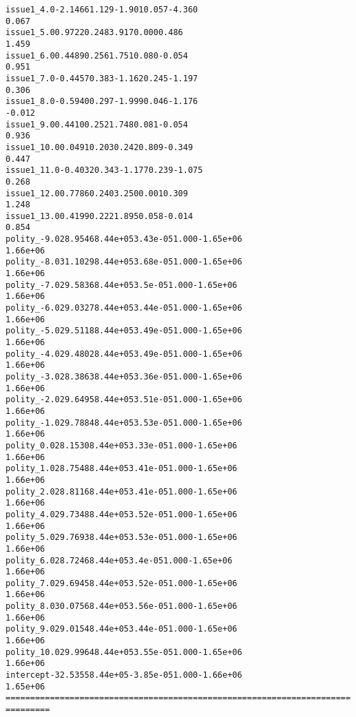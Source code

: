 \documentclass[letterpaper,10pt,english]{/usr/share/sphinx/texinputs/sphinxhowto}
\newenvironment{InvisibleVerbatim}
        {\begin{mdframed}[leftmargin=0.1\linewidth,innerleftmargin=3pt,innerrightmargin=3pt, userdefinedwidth=1\linewidth, linewidth=0pt, linecolor=white, usetwoside=false]}
        {\end{mdframed}}
\begin{document}
\begin{InvisibleVerbatim}
\begin{alltt}
issue1\_4.0     -2.1466      1.129     -1.901      0.057        -4.360
0.067
issue1\_5.0      0.9722      0.248      3.917      0.000         0.486
1.459
issue1\_6.0      0.4489      0.256      1.751      0.080        -0.054
0.951
issue1\_7.0     -0.4457      0.383     -1.162      0.245        -1.197
0.306
issue1\_8.0     -0.5940      0.297     -1.999      0.046        -1.176
-0.012
issue1\_9.0      0.4410      0.252      1.748      0.081        -0.054
0.936
issue1\_10.0     0.0491      0.203      0.242      0.809        -0.349
0.447
issue1\_11.0    -0.4032      0.343     -1.177      0.239        -1.075
0.268
issue1\_12.0     0.7786      0.240      3.250      0.001         0.309
1.248
issue1\_13.0     0.4199      0.222      1.895      0.058        -0.014
0.854
polity\_-9.0    28.9546   8.44e+05   3.43e-05      1.000     -1.65e+06
1.66e+06
polity\_-8.0    31.1029   8.44e+05   3.68e-05      1.000     -1.65e+06
1.66e+06
polity\_-7.0    29.5836   8.44e+05    3.5e-05      1.000     -1.65e+06
1.66e+06
polity\_-6.0    29.0327   8.44e+05   3.44e-05      1.000     -1.65e+06
1.66e+06
polity\_-5.0    29.5118   8.44e+05   3.49e-05      1.000     -1.65e+06
1.66e+06
polity\_-4.0    29.4802   8.44e+05   3.49e-05      1.000     -1.65e+06
1.66e+06
polity\_-3.0    28.3863   8.44e+05   3.36e-05      1.000     -1.65e+06
1.66e+06
polity\_-2.0    29.6495   8.44e+05   3.51e-05      1.000     -1.65e+06
1.66e+06
polity\_-1.0    29.7884   8.44e+05   3.53e-05      1.000     -1.65e+06
1.66e+06
polity\_0.0     28.1530   8.44e+05   3.33e-05      1.000     -1.65e+06
1.66e+06
polity\_1.0     28.7548   8.44e+05   3.41e-05      1.000     -1.65e+06
1.66e+06
polity\_2.0     28.8116   8.44e+05   3.41e-05      1.000     -1.65e+06
1.66e+06
polity\_4.0     29.7348   8.44e+05   3.52e-05      1.000     -1.65e+06
1.66e+06
polity\_5.0     29.7693   8.44e+05   3.53e-05      1.000     -1.65e+06
1.66e+06
polity\_6.0     28.7246   8.44e+05    3.4e-05      1.000     -1.65e+06
1.66e+06
polity\_7.0     29.6945   8.44e+05   3.52e-05      1.000     -1.65e+06
1.66e+06
polity\_8.0     30.0756   8.44e+05   3.56e-05      1.000     -1.65e+06
1.66e+06
polity\_9.0     29.0154   8.44e+05   3.44e-05      1.000     -1.65e+06
1.66e+06
polity\_10.0    29.9964   8.44e+05   3.55e-05      1.000     -1.65e+06
1.66e+06
intercept     -32.5355   8.44e+05  -3.85e-05      1.000     -1.66e+06
1.65e+06
======================================================================
=========
\end{alltt}

            \end{InvisibleVerbatim}
            
\end{document}
